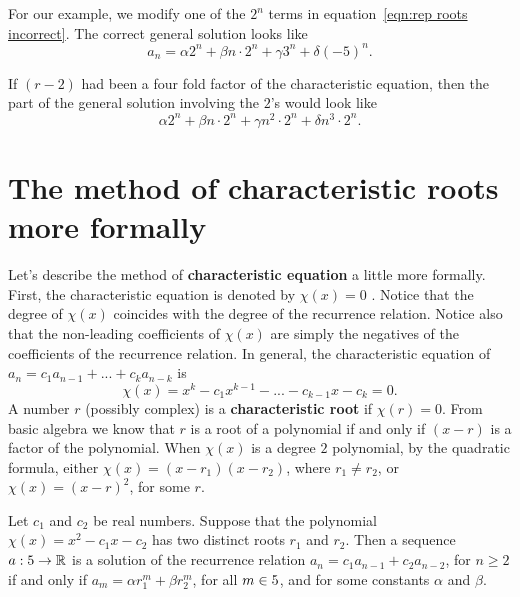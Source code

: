 For our example, we modify one of the $2^n$ terms in equation~\ref{eqn:rep roots incorrect}. The correct general solution looks like
\[
 a_n= \alpha 2^n+\beta n\cdot 2^n+\gamma 3^n+\delta (-5)^n.
\]


If $(r-2)$ had been a four fold factor of the characteristic
equation, then the part of the general solution involving the $2$'s would
look like 
\[
 \alpha 2^n+\beta n\cdot2^n+\gamma n^2\cdot2^n+\delta n^3\cdot2^n.
\]  



\section{The method of characteristic roots more formally}
Let's describe the method of {\bfseries characteristic equation} a little more
formally.  First, the characteristic equation is  denoted  by $\chi(x)=0$ %
. Notice
that the degree of $\chi(x)$ coincides with the degree of the recurrence relation.
Notice also that the non-leading coefficients of $\chi(x)$ are simply the negatives of the
coefficients of the recurrence relation. In general, 
the characteristic equation of $a_n=c_1a_{n-1}+...+c_ka_{n-k}$ is 
\[
 \chi(x)=x^k-c_1x^{k-1}-...-c_{k-1}x-c_{k}=0.
\]
A number $r$ (possibly complex) is a {\bfseries characteristic root} if $\chi(r)=0$. From basic algebra we know 
that $r$ is a root of a polynomial if and only if $(x-r)$ is a factor of the polynomial. 
When $\chi(x)$ is a degree $2$ polynomial, by the quadratic formula, either $\chi(x)=(x-r_1)(x-r_2)$, 
where $r_1\neq r_2$, or $\chi(x)=(x-r)^2$, for some $r$.
\begin{thm}
 Let $c_1$ and $c_2$ be real numbers. Suppose that the polynomial $\chi(x)=x^2-c_1x-c_2$
 has two distinct roots $r_1$ and $r_2$. Then a sequence $a:5\to \mathbb{R}$ is a solution of the
 recurrence relation $a_n=c_1a_{n-1}+c_2a_{n-2}$, for $n\geq 2$ if and only if
  $a_m=\alpha r_1^m+\beta r_2^m$, 
 for all $m\in 5$, and for some constants $\alpha$ and $\beta$.
 \ms
\end{thm}
